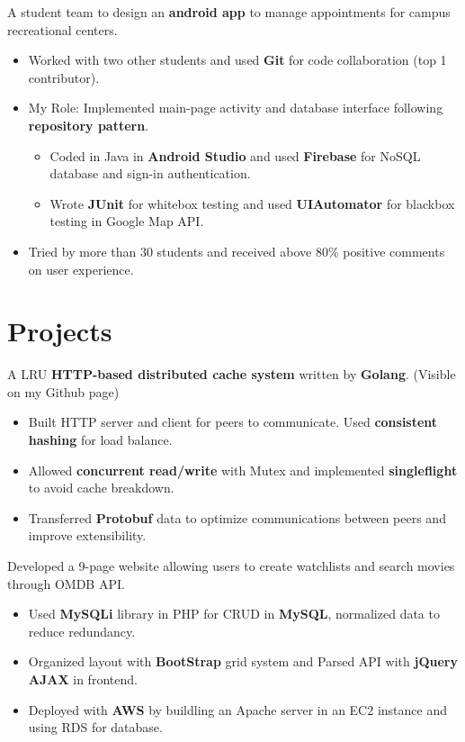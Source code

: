 \documentclass{resume}
\begin{document}
  A student team to design an \textbf{android app} to manage appointments for campus recreational centers.
\begin{itemize}
  \item Worked with two other students and used \textbf{Git} for code collaboration (top 1 contributor).
  \item My Role: Implemented main-page activity and database interface following \textbf{repository pattern}.
  \begin{itemize}
    \item Coded in Java in \textbf{Android Studio} and used \textbf{Firebase} for NoSQL database and sign-in authentication. 
    \item Wrote \textbf{JUnit} for whitebox testing and used \textbf{UIAutomator} for blackbox testing in Google Map API.
  \end{itemize}
  \item Tried by more than 30 students and received above 80\% positive comments on user experience.
\end{itemize}

\section{Projects}
  A LRU \textbf{HTTP-based distributed cache system} written by \textbf{Golang}. (Visible on my Github page)
\begin{itemize}
  \item Built HTTP server and client for peers to communicate. Used \textbf{consistent hashing} for load balance.
  \item Allowed \textbf{concurrent read/write} with Mutex and implemented \textbf{singleflight} to avoid cache breakdown.
  \item Transferred \textbf{Protobuf} data to optimize communications between peers and improve extensibility.
\end{itemize}

  Developed a 9-page website allowing users to create watchlists and search movies through OMDB API.
\begin{itemize}
  \item Used \textbf{MySQLi} library in PHP for CRUD in \textbf{MySQL}, normalized data to reduce redundancy.
  \item Organized layout with \textbf{BootStrap} grid system and Parsed API with \textbf{jQuery AJAX} in frontend.
  \item Deployed with \textbf{AWS} by buildling an Apache server in an EC2 instance and using RDS for database.
\end{itemize}
\end{document}
